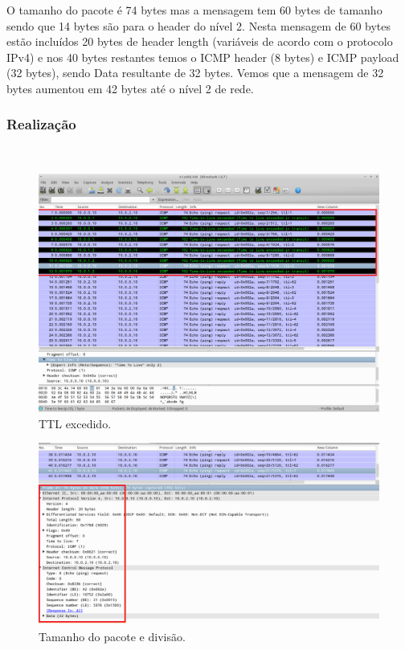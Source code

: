 \documentclass{llncs}
\begin{document}
O tamanho do pacote é 74 bytes mas a mensagem tem 60 bytes de tamanho sendo que 14 bytes são para o header do nível 2. Nesta mensagem de 60 bytes estão incluídos 20 bytes de header length (variáveis de acordo com o protocolo IPv4) e nos 40 bytes restantes temos o ICMP header (8 bytes) e ICMP payload (32 bytes), sendo Data resultante de 32 bytes. Vemos que a mensagem de 32 bytes aumentou em 42 bytes até o nível 2 de rede.

\subsubsection{Realização}\rule[-10pt]{0pt}{10pt}\\
\begin{figure}
	\begin{center}
	\includegraphics[scale=0.35]{imagens/ttlexceeded.png} 
	\end{center}
	\caption{\label{fig:ip_source}TTL excedido.}
\end{figure} 

\begin{figure}
	\begin{center}
	\includegraphics[scale=0.35]{imagens/bytesdata.png} 
	\end{center}
	\caption{\label{fig:ip_source}Tamanho do pacote e divisão.}
\end{figure} 
\end{document}
